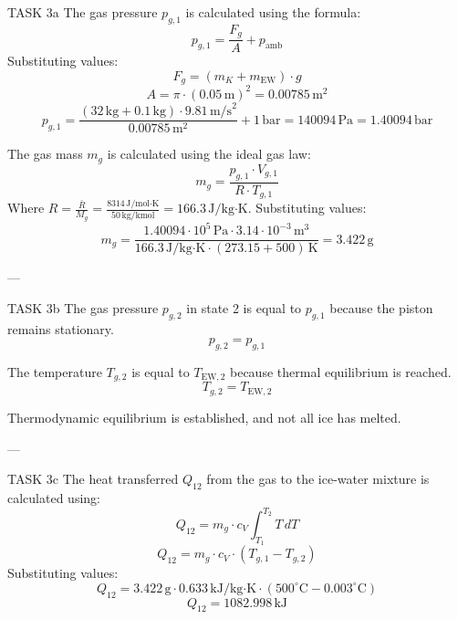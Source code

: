 TASK 3a  
The gas pressure \( p_{g,1} \) is calculated using the formula:  
\[
p_{g,1} = \frac{F_g}{A} + p_{\text{amb}}
\]  
Substituting values:  
\[
F_g = (m_K + m_{\text{EW}}) \cdot g
\]  
\[
A = \pi \cdot (0.05 \, \text{m})^2 = 0.00785 \, \text{m}^2
\]  
\[
p_{g,1} = \frac{(32 \, \text{kg} + 0.1 \, \text{kg}) \cdot 9.81 \, \text{m/s}^2}{0.00785 \, \text{m}^2} + 1 \, \text{bar} = 140094 \, \text{Pa} = 1.40094 \, \text{bar}
\]  

The gas mass \( m_g \) is calculated using the ideal gas law:  
\[
m_g = \frac{p_{g,1} \cdot V_{g,1}}{R \cdot T_{g,1}}
\]  
Where \( R = \frac{\bar{R}}{M_g} = \frac{8314 \, \text{J/mol·K}}{50 \, \text{kg/kmol}} = 166.3 \, \text{J/kg·K} \).  
Substituting values:  
\[
m_g = \frac{1.40094 \cdot 10^5 \, \text{Pa} \cdot 3.14 \cdot 10^{-3} \, \text{m}^3}{166.3 \, \text{J/kg·K} \cdot (273.15 + 500) \, \text{K}} = 3.422 \, \text{g}
\]  

---

TASK 3b  
The gas pressure \( p_{g,2} \) in state 2 is equal to \( p_{g,1} \) because the piston remains stationary.  
\[
p_{g,2} = p_{g,1}
\]  

The temperature \( T_{g,2} \) is equal to \( T_{\text{EW},2} \) because thermal equilibrium is reached.  
\[
T_{g,2} = T_{\text{EW},2}
\]  

Thermodynamic equilibrium is established, and not all ice has melted.  

---

TASK 3c  
The heat transferred \( Q_{12} \) from the gas to the ice-water mixture is calculated using:  
\[
Q_{12} = m_g \cdot c_V \int_{T_1}^{T_2} T \, dT
\]  
\[
Q_{12} = m_g \cdot c_V \cdot (T_{g,1} - T_{g,2})
\]  
Substituting values:  
\[
Q_{12} = 3.422 \, \text{g} \cdot 0.633 \, \text{kJ/kg·K} \cdot (500^\circ\text{C} - 0.003^\circ\text{C})
\]  
\[
Q_{12} = 1082.998 \, \text{kJ}
\]  